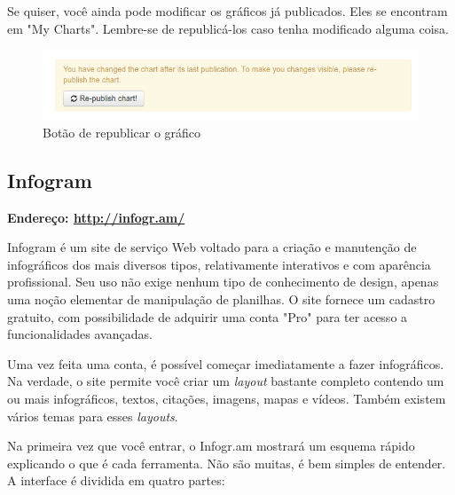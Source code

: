 \documentclass[12pt,onecolumn]{article}
\begin{document}
    Se quiser, você ainda pode modificar os gráficos já publicados. Eles se encontram
    em "My Charts". Lembre-se de republicá-los caso tenha modificado alguma coisa.

  \begin{figure}[H]
    \begin{center}
      \includegraphics[scale=0.5]{datawrapper-republish}
      \caption{Botão de republicar o gráfico}
      \label{fig:datawrapper-republish}
    \end{center}
  \end{figure}

  \subsection{Infogram}
    \textbf{Endereço: \url{http://infogr.am/}}
    
    Infogram é um site de serviço Web voltado para a criação e manutenção de
    infográficos dos mais diversos tipos, relativamente interativos e com
    aparência profissional. Seu uso não exige nenhum tipo de conhecimento de
    design, apenas uma noção elementar de manipulação de planilhas. O site fornece
    um cadastro gratuito, com possibilidade de adquirir uma conta "Pro" para ter
    acesso a funcionalidades avançadas.
    
    Uma vez feita uma conta, é possível começar imediatamente a fazer
    infográficos. Na verdade, o site permite você criar um \textit{layout}
    bastante completo contendo um ou mais infográficos, textos, citações, imagens,
    mapas e vídeos. Também existem vários temas para esses \textit{layouts}.
    
    Na primeira vez que você entrar, o Infogr.am mostrará um esquema rápido
    explicando o que é cada ferramenta. Não são muitas, é bem simples de entender.
    A interface é dividida em quatro partes:
    
\end{document}
